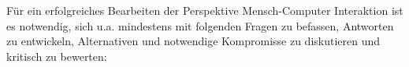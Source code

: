 

	


	

Für ein erfolgreiches Bearbeiten der Perspektive Mensch-Computer Interaktion ist es notwendig, sich u.a. mindestens mit folgenden Fragen zu befassen, Antworten zu entwickeln, Alternativen und notwendige Kompromisse zu diskutieren und kritisch zu bewerten:

